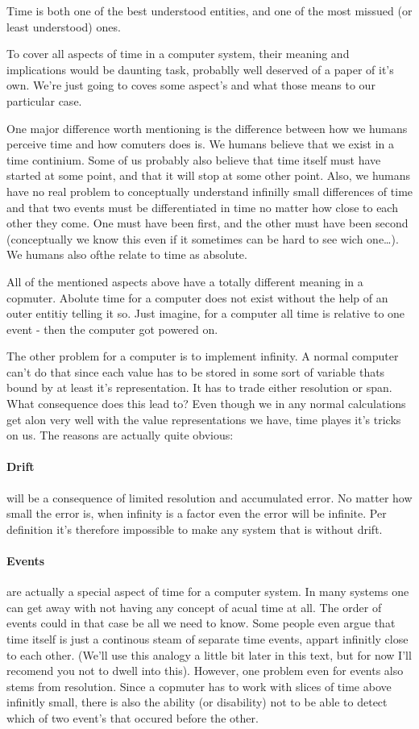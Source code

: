 		Time is both one of the best understood entities, and one of the most missued (or least understood) ones.

		To cover all aspects of time in a computer system, their meaning and implications would be daunting task, probablly well deserved of a paper of it's own. We're just going to coves some aspect's and what those means to our particular case.

		One major difference worth mentioning is the difference between how we humans perceive time and how comuters does is. We humans believe that we exist in a time continium. Some of us probably also believe that time itself must have started at some point, and that it will stop at some other point. Also, we humans have no real problem to conceptually understand infinilly small differences of time and that two events must be differentiated in time no matter how close to each other they come. One must have been first, and the other must have been second (conceptually we know this even if it sometimes can be hard to see wich one\ldots). We humans also ofthe relate to time as absolute.

		All of the mentioned aspects above have a totally different meaning in a copmuter. Abolute time for a computer does not exist without the help of an outer entitiy telling it so. Just imagine, for a computer all time is relative to one event - then the computer got powered on.

		The other problem for a computer is to implement infinity. A normal computer can't do that since each value has to be stored in some sort of variable thats bound by at least it's representation. It has to trade either resolution or span. What consequence does this lead to? Even though we in any normal calculations get alon very well with the value representations we have, time playes it's tricks on us. The reasons are actually quite obvious: 

		\paragraph{Drift} will be a consequence of limited resolution and accumulated error. No matter how small the error is, when infinity is a factor even the error will be infinite. Per definition it's therefore impossible to make any system that is without drift.

		\paragraph{Events} are actually a special aspect of time for a computer system. In many systems one can get away with not having any concept of acual time at all. The order of events could in that case be all we need to know. Some people even argue that time itself is just a continous steam of separate time events, appart infinitly close to each other. (We'll use this analogy a little bit later in this text, but for now I'll recomend you not to dwell into this). However, one problem even for events also stems from resolution. Since a copmuter has to work with slices of time above infinitly small, there is also the ability (or disability) not to be able to detect which of two event's that occured before the other.

